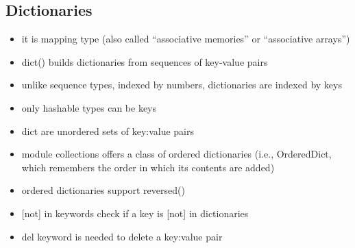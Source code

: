 \documentclass[11pt]{article}
\providecommand{\tightlist}{%
      \setlength{\itemsep}{0pt}\setlength{\parskip}{0pt}}
\begin{document}
    \hypertarget{dictionaries}{%
\subsection{Dictionaries}\label{dictionaries}}

\begin{itemize}
\tightlist
\item
  it is mapping type (also called ``associative memories'' or
  ``associative arrays'')
\item
  dict() builds dictionaries from sequences of key-value pairs
\item
  unlike sequence types, indexed by numbers, dictionaries are indexed by
  keys
\item
  only hashable types can be keys
\item
  dict are unordered sets of key:value pairs
\item
  module collections offers a class of ordered dictionaries (i.e.,
  OrderedDict, which remembers the order in which its contents are
  added)
\item
  ordered dictionaries support reversed()
\item
  {[}not{]} in keywords check if a key is {[}not{]} in dictionaries
\item
  del keyword is needed to delete a key:value pair
\end{itemize}
\end{document}
